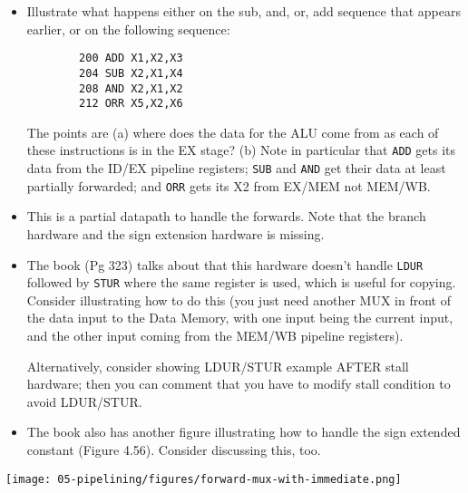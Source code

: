 \begin{frame}[fragile]
\BNotes\ifnum{}
\begin{itemize}
	\item Illustrate what happens either on the sub, and, or, add
		sequence that appears earlier, or on the following sequence:
		\begin{verbatim}
		200 ADD X1,X2,X3
		204 SUB X2,X1,X4
		208 AND X2,X1,X2
		212 ORR X5,X2,X6
		\end{verbatim}
		The points are (a) where does the data for the ALU come
		from as each of these instructions is in the EX stage?
		(b) Note in particular that \texttt{ADD} gets its data
		from the ID/EX pipeline registers; \texttt{SUB} and \texttt{AND}
		get their data at least partially forwarded; and \texttt{ORR}
		gets its X2 from EX/MEM not MEM/WB.
	\item This is a partial datapath to handle the forwards.  Note
		that the branch hardware and the sign extension hardware
		is missing.
	\item The book (Pg 323) talks about that this hardware doesn't handle
		\texttt{LDUR} followed by \texttt{STUR} where the same
		register is used, which is useful for copying.  Consider
		illustrating how to do this (you just need another MUX
		in front of the data input to the Data Memory, with
		one input being the current input, and the other input
		coming from the MEM/WB pipeline registers).

		Alternatively, consider showing LDUR/STUR example AFTER
		stall hardware; then you can comment that you have to
		modify stall condition to avoid LDUR/STUR.
	\item The book also has another figure illustrating how to handle
		the sign extended constant (Figure 4.56).  Consider
		discussing this, too.
\end{itemize}
\fi\ENotes
\end{frame}

\begin{frame}[fragile]
	\texttt{[image: 05-pipelining/figures/forward-mux-with-immediate.png]}

 \end{frame}

